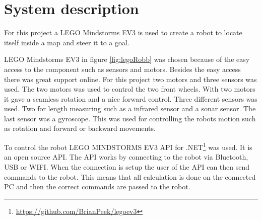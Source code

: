 \chapter{System description}
\label{chp:sysdes}

For this project a LEGO Mindstorms EV3 is used to create a robot to locate itself inside a map and steer it to a goal.


LEGO Mindstorms EV3 in figure \ref{fig:legoRobb} was chosen because of the easy access to the component such as sensors and motors. Besides the easy access there was great support online. 
For this project two motors and three sensors was used. The two motors was used to control the two front wheels. With two motors it gave a seamless rotation and a nice forward control. Three different sensors was used. Two for length measuring such as a infrared sensor and a sonar sensor. The last sensor was a gyroscope. This was used for controlling the robots motion such as rotation and forward or backward movements.

To control the robot LEGO MINDSTORMS EV3 API for .NET\footnote{\url{https://github.com/BrianPeek/legoev3}} was used. It is an open source API. The API works by connecting to the robot via Bluetooth, USB or WIFI. When the connection is setup the user of the API can then send commands to the robot. This means that all calculation is done on the connected PC and then the correct commands are passed to the robot.